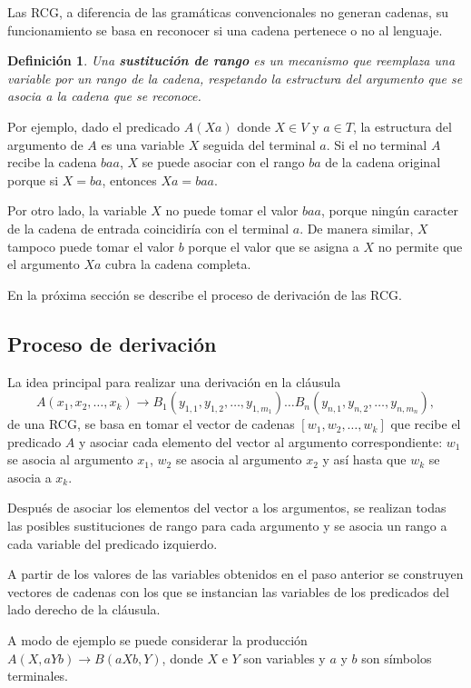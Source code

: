\documentclass{article}
\newtheorem{definition}{Definición}
\begin{document}
Las RCG, a diferencia de las gramáticas convencionales no generan cadenas, su funcionamiento se basa en reconocer si una cadena pertenece o no al lenguaje.


\begin{definition}
    Una \textbf{sustitución de rango} es un mecanismo que reemplaza una variable por un
    rango de la cadena, respetando la estructura del argumento que se asocia a la cadena que se reconoce.
\end{definition}

Por ejemplo, dado el predicado $A(Xa)$ donde $X \in V$ y $a \in T$, la estructura del argumento de $A$ es una variable $X$ seguida del terminal $a$. Si el no terminal $A$ recibe la cadena $baa$, $X$ se puede asociar con el rango $ba$ de la cadena original porque si $X=ba$, entonces $Xa=baa$.

Por otro lado, la variable $X$ no puede tomar el valor $baa$, porque ningún caracter de la cadena de entrada coincidiría
con el terminal $a$. De manera similar, $X$ tampoco puede tomar el valor $b$ porque el valor que se asigna a $X$ no permite que el argumento $Xa$ cubra la cadena completa.

En la próxima sección se describe el proceso de derivación de las RCG.

\subsection{Proceso de derivación}

La idea principal para realizar una derivación en la cláusula
\[
    A(x_1, x_2, \ldots, x_k) \to B_1(y_{1,1}, y_{1,2}, \ldots, y_{1,m_1}) \ldots B_n(y_{n,1}, y_{n,2}, \ldots, y_{n,m_n}),
\]
de una RCG, se basa en tomar el vector de cadenas $[w_1, w_2,\ldots, w_k]$ que recibe el predicado $A$ y asociar cada elemento del vector al argumento
correspondiente: $w_1$ se asocia al argumento $x_1$, $w_2$ se asocia al argumento $x_2$ y así hasta que
$w_k$ se asocia a $x_k$.

Después de asociar los elementos del vector a los argumentos, se realizan todas las posibles sustituciones de rango para cada argumento y se asocia un rango a
cada variable del predicado izquierdo.

A partir de los valores de las variables obtenidos en el paso anterior se construyen vectores de cadenas con los que se
instancian las variables de los predicados del lado derecho de la cláusula.

A modo de ejemplo se puede considerar la producción $A(X,aYb)\to B(aXb,Y)$, donde $X$ e $Y$ son variables y $a$ y $b$ son símbolos terminales.
\end{document}
